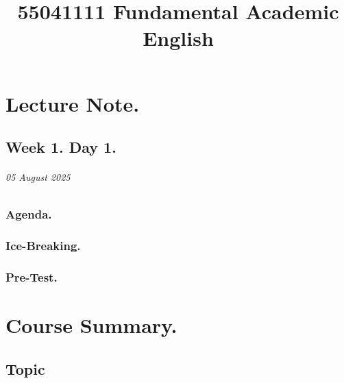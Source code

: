 \documentclass[11pt]{book}
\title{55041111 Fundamental Academic English}
\begin{document}
\maketitle
\tableofcontents


\part{Lecture Note.}
	\chapter{Week 1. Day 1.}
		\paragraph{05 August 2025}
		\section{Agenda.}
		
		\section{Ice-Breaking.}
		
		\section{Pre-Test.}


\part{Course Summary.}
	\chapter{Topic}
\end{document}
